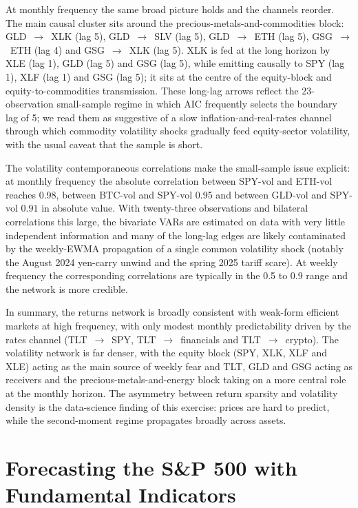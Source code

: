 \documentclass[12pt,a4paper]{article}
\newcommand{\probsection}[2]{\section{#2}}
\begin{document}
At monthly frequency the same broad picture holds and the channels reorder. The main causal cluster sits around the precious-metals-and-commodities block: GLD~$\rightarrow$~XLK (lag 5), GLD~$\rightarrow$~SLV (lag 5), GLD~$\rightarrow$~ETH (lag 5), GSG~$\rightarrow$~ETH (lag 4) and GSG~$\rightarrow$~XLK (lag 5). XLK is fed at the long horizon by XLE (lag 1), GLD (lag 5) and GSG (lag 5), while emitting causally to SPY (lag 1), XLF (lag 1) and GSG (lag 5); it sits at the centre of the equity-block and equity-to-commodities transmission. These long-lag arrows reflect the 23-observation small-sample regime in which AIC frequently selects the boundary lag of 5; we read them as suggestive of a slow inflation-and-real-rates channel through which commodity volatility shocks gradually feed equity-sector volatility, with the usual caveat that the sample is short.

The volatility contemporaneous correlations make the small-sample issue explicit: at monthly frequency the absolute correlation between SPY-vol and ETH-vol reaches 0.98, between BTC-vol and SPY-vol 0.95 and between GLD-vol and SPY-vol $0.91$ in absolute value. With twenty-three observations and bilateral correlations this large, the bivariate VARs are estimated on data with very little independent information and many of the long-lag edges are likely contaminated by the weekly-EWMA propagation of a single common volatility shock (notably the August 2024 yen-carry unwind and the spring 2025 tariff scare). At weekly frequency the corresponding correlations are typically in the 0.5 to 0.9 range and the network is more credible.

In summary, the returns network is broadly consistent with weak-form efficient markets at high frequency, with only modest monthly predictability driven by the rates channel (TLT~$\rightarrow$~SPY, TLT~$\rightarrow$~financials and TLT~$\rightarrow$~crypto). The volatility network is far denser, with the equity block (SPY, XLK, XLF and XLE) acting as the main source of weekly fear and TLT, GLD and GSG acting as receivers and the precious-metals-and-energy block taking on a more central role at the monthly horizon. The asymmetry between return sparsity and volatility density is the data-science finding of this exercise: prices are hard to predict, while the second-moment regime propagates broadly across assets.

\probsection{2}{Forecasting the S\&P 500 with Fundamental Indicators}
\end{document}
